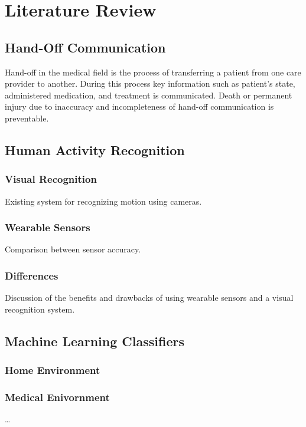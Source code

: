 
\chapter{Literature Review}
\label{ch:Literature-Review}

\section{Hand-Off Communication}
\label{sec:Literature-Review:Hand-Off Communication}
Hand-off in the medical field is the process of transferring a patient from one care provider to another. During this process key information such as patient's state, administered medication, and treatment is communicated. Death or permanent injury due to inaccuracy and incompleteness of hand-off communication is preventable.\cite{SoletDJNorvellJMRutanGH2005}
\par 

\section{Human Activity Recognition}
\label{sec:Literature-Review:Human-Activity-Recognition}

\subsection{Visual Recognition}
Existing system for recognizing motion using cameras.

\subsection{Wearable Sensors}
Comparison between sensor accuracy.

\subsection{Differences}
Discussion of the benefits and drawbacks of using wearable sensors and a visual recognition system.

\section{Machine Learning Classifiers}
\label{sec:Literature-Review:Machine-Learning-Classifiers}

\subsection{Home Environment}

\subsection{Medical Enivornment}

\dots